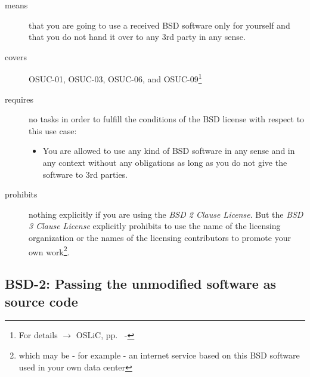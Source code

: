 \begin{description}
\item[means] that you are going to use a received BSD software only for yourself
and that you do not hand it over to any 3rd party in any sense.
\item[covers] OSUC-01, OSUC-03, OSUC-06, and OSUC-09\footnote{For details $\rightarrow$ OSLiC, pp.\
  \pageref{OSUC-01-DEF} - \pageref{OSUC-09-DEF}}
\item[requires] no tasks in order to fulfill the conditions of the BSD license
with respect to this use case:
  \begin{itemize}
    \item You are allowed to use any kind of BSD software in any sense and in
    any context without any obligations as long as you do not give the software
    to 3rd parties.
  \end{itemize}
\item[prohibits] nothing explicitly if you are using the \emph{BSD 2 Clause
License}. But the \emph{BSD 3 Clause License} explicitly prohibits to use the
name of the licensing organization or the names of the licensing contributors to
promote your own work\footnote{which may be - for example - an internet service
based on this BSD software used in your own data center}.
\end{description}


\subsection{BSD-2: Passing the unmodified software as source code}
\label{OSUC-02-BSD} \label{OSUC-05-BSD} \label{OSUC-07-BSD} 

